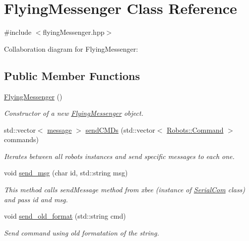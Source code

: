 \hypertarget{class_flying_messenger}{}\section{Flying\+Messenger Class Reference}
\label{class_flying_messenger}


{\ttfamily \#include $<$flying\+Messenger.\+hpp$>$}



Collaboration diagram for Flying\+Messenger\+:
\subsection*{Public Member Functions}
\begin{DoxyCompactItemize}
\item 
\hyperlink{class_flying_messenger_af9b7f5eb0e17e3c3cbf41ce14554f19b}{Flying\+Messenger} ()
\begin{DoxyCompactList}\small\item\em Constructor of a new \hyperlink{class_flying_messenger}{Flying\+Messenger} object. \end{DoxyCompactList}\item 
std\+::vector$<$ \hyperlink{structmessage}{message} $>$ \hyperlink{class_flying_messenger_a97b0db02039cde3d9d80225e4db0f23a}{send\+C\+M\+Ds} (std\+::vector$<$ \hyperlink{struct_robots_1_1_command}{Robots\+::\+Command} $>$ commands)
\begin{DoxyCompactList}\small\item\em Iterates between all robots instances and send specific messages to each one. \end{DoxyCompactList}\item 
void \hyperlink{class_flying_messenger_a6cb8e42cf99c0a11afbb441db28864a3}{send\+\_\+msg} (char id, std\+::string msg)
\begin{DoxyCompactList}\small\item\em This method calls send\+Message method from xbee (instance of \hyperlink{class_serial_com}{Serial\+Com} class) and pass id and msg. \end{DoxyCompactList}\item 
void \hyperlink{class_flying_messenger_a7dd37ffc3394c87f190cbf6dc9405304}{send\+\_\+old\+\_\+format} (std\+::string cmd)
\begin{DoxyCompactList}\small\item\em Send command using old formatation of the string. \end{DoxyCompactList}\item 

\end{DoxyCompactItemize}
